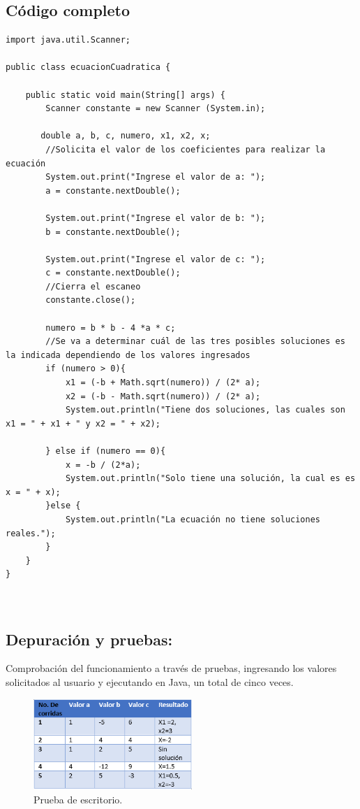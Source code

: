 \subsection{Código completo}
\begin{lstlisting}[style=javaStyle]
import java.util.Scanner;

public class ecuacionCuadratica {

    public static void main(String[] args) {
        Scanner constante = new Scanner (System.in); 
        
       double a, b, c, numero, x1, x2, x;
        //Solicita el valor de los coeficientes para realizar la ecuación
        System.out.print("Ingrese el valor de a: ");
        a = constante.nextDouble();
        
        System.out.print("Ingrese el valor de b: ");
        b = constante.nextDouble();
        
        System.out.print("Ingrese el valor de c: ");
        c = constante.nextDouble();
        //Cierra el escaneo
        constante.close();
        
        numero = b * b - 4 *a * c;
        //Se va a determinar cuál de las tres posibles soluciones es la indicada dependiendo de los valores ingresados
        if (numero > 0){
            x1 = (-b + Math.sqrt(numero)) / (2* a);
            x2 = (-b - Math.sqrt(numero)) / (2* a);
            System.out.println("Tiene dos soluciones, las cuales son x1 = " + x1 + " y x2 = " + x2);
            
        } else if (numero == 0){
            x = -b / (2*a);
            System.out.println("Solo tiene una solución, la cual es es x = " + x);
        }else {
            System.out.println("La ecuación no tiene soluciones reales.");
        }
    }
}



\end{lstlisting}
\subsection{\textbf{Depuración y pruebas:}}
Comprobación del funcionamiento a través de pruebas, ingresando los valores solicitados al usuario y ejecutando en Java, un total de cinco veces.
\begin{figure}[!ht]
\centering
\includegraphics[width=6cm]{LaTeX/latex-imagenes/tablaprueba.png}
\caption{Prueba de escritorio.}
\label{fig:diagrama_flujo}
\end{figure}